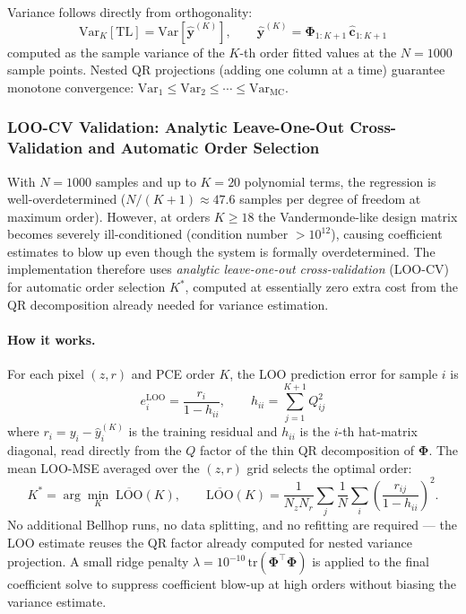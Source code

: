 \documentclass[11pt,a4paper]{article}
\newcommand{\Var}{\mathrm{Var}}
\newcommand{\TL}{\mathrm{TL}}
\begin{document}
Variance follows directly from orthogonality:
\begin{equation}
  \Var_K[\TL] = \mathrm{Var}\!\left[\hat{\mathbf{y}}^{(K)}\right], \qquad
  \hat{\mathbf{y}}^{(K)} = \boldsymbol\Phi_{1:K+1}\,\hat{\mathbf{c}}_{1:K+1}
  \label{eq:pce_var}
\end{equation}
computed as the sample variance of the $K$-th order fitted values at the $N=1000$
sample points.
Nested QR projections (adding one column at a time) guarantee
monotone convergence: $\Var_1 \leq \Var_2 \leq \cdots \leq \Var_\text{MC}$.

\subsubsection{LOO-CV Validation: Analytic Leave-One-Out Cross-Validation and Automatic Order Selection}
\label{sec:pce_loo}

With $N=1000$ samples and up to $K=20$ polynomial terms, the regression is
well-overdetermined ($N/(K+1)\approx47.6$ samples per degree of freedom at maximum order).
However, at orders $K\geq18$ the Vandermonde-like design matrix becomes severely
ill-conditioned (condition number $>10^{12}$), causing coefficient estimates to blow up
even though the system is formally overdetermined.
The implementation therefore uses \emph{analytic leave-one-out
cross-validation} (LOO-CV) for automatic order selection $K^*$, computed at essentially zero
extra cost from the QR decomposition already needed for variance estimation.

\paragraph{How it works.}
For each pixel $(z,r)$ and PCE order $K$, the LOO prediction error for sample $i$ is
\begin{equation}
  e_i^{\text{LOO}} = \frac{r_i}{1 - h_{ii}},
  \qquad h_{ii} = \sum_{j=1}^{K+1} Q_{ij}^2
  \label{eq:loo_impl}
\end{equation}
where $r_i = y_i - \hat{y}_i^{(K)}$ is the training residual and $h_{ii}$ is the
$i$-th hat-matrix diagonal, read directly from the $Q$ factor of the thin QR decomposition
of $\boldsymbol\Phi$.
The mean LOO-MSE averaged over the $(z,r)$ grid selects the optimal order:
\begin{equation}
  K^* = \arg\min_K \;\overline{\text{LOO}}(K),
  \qquad
  \overline{\text{LOO}}(K) = \frac{1}{N_z N_r}\sum_{j}\frac{1}{N}\sum_{i}
  \left(\frac{r_{ij}}{1-h_{ii}}\right)^{\!2}.
  \label{eq:loo_kstar}
\end{equation}
No additional Bellhop runs, no data splitting, and no refitting are required ---
the LOO estimate reuses the QR factor already computed for nested variance projection.
A small ridge penalty $\lambda = 10^{-10}\,\mathrm{tr}(\boldsymbol\Phi^\top\boldsymbol\Phi)$
is applied to the final coefficient solve to suppress coefficient blow-up at high orders
without biasing the variance estimate.
\end{document}

